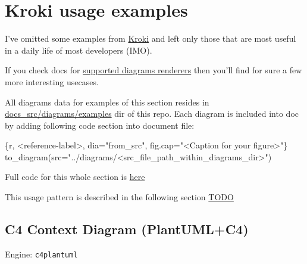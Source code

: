 \documentclass[
  12pt,
  a4paper,
  12pt,
  oneside,
  openany]{book}
\newenvironment{Shaded}{\begin{snugshade}}{\end{snugshade}}
\newcommand{\DataTypeTok}[1]{\textcolor[rgb]{0.27,0.27,0.27}{#1}}
\newcommand{\StringTok}[1]{\textcolor[rgb]{0.5,0.5,0.5}{#1}}
\begin{document}
\hypertarget{examples-kroki}{%
\chapter{Kroki usage examples}\label{examples-kroki}}

I've omitted some examples from \href{https://kroki.io/examples.html}{Kroki} and left only those that are most useful in a daily life of most developers (IMO).

If you check docs for \href{https://kroki.io/\#support}{supported diagrams renderers} then you'll find for sure a few more interesting usecases.

All diagrams data for examples of this section resides in \href{https://github.com/Godhart/devdoc-swissknife/tree/main/docs_src/diagrams/examples}{docs\_src/diagrams/examples} dir of this repo. Each diagram is included into doc by adding following code section into document file:

\begin{Shaded}
\begin{Highlighting}[]
\StringTok{\textasciigrave{}\textasciigrave{}\textasciigrave{}}\DataTypeTok{\{r, \textless{}reference{-}label\textgreater{}, dia="from\_src", fig.cap="\textless{}Caption for your figure\textgreater{}"\}}
\DataTypeTok{  to\_diagram(src="../diagrams/\textless{}src\_file\_path\_within\_diagrams\_dir\textgreater{}")}
\StringTok{\textasciigrave{}\textasciigrave{}\textasciigrave{}}
\end{Highlighting}
\end{Shaded}

Full code for this whole section is \href{https://github.com/Godhart/devdoc-swissknife/blob/main/docs_src/devdoc-swissknife-en/03-KrokiExamples.Rmd}{here}

This usage pattern is described in the following section \protect\hyperlink{TODO}{TODO}

\newpage

\hypertarget{kroki-c4context}{%
\section{C4 Context Diagram (PlantUML+C4)}\label{kroki-c4context}}

Engine: \texttt{c4plantuml}
\end{document}
